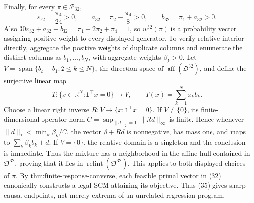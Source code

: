 Finally, for every \(\pi\in\mathcal P_{32}\),
\[
\varepsilon_{32}=\frac{\pi_4}{24}>0,
\qquad
a_{32}=\pi_2-\frac{\pi_4}{8}>0,
\qquad
b_{32}=\pi_1+a_{32}>0.
\tag{36}
\]
Also \(30\varepsilon_{32}+a_{32}+b_{32}=\pi_1+2\pi_2+\pi_4=1\), so \(w^{32}(\pi)\) is a probability vector assigning positive weight to every displayed generator.  To verify relative interior directly, aggregate the positive weights of duplicate columns and enumerate the distinct columns as \(b_1,\ldots,b_N\), with aggregate weights \(\beta_k>0\).  Let \(V=\operatorname{span}\{b_k-b_1:2\leq k\leq N\}\), the direction space of \(\operatorname{aff}(\mathfrak O^{32})\), and define the surjective linear map
\[
T:\{x\in\mathbb R^N:\mathbf 1^{\top}x=0\}\longrightarrow V,
\qquad T(x)=\sum_{k=1}^N x_kb_k.
\]
Choose a linear right inverse \(R:V\to\{x:\mathbf 1^{\top}x=0\}\).  If \(V\neq\{0\}\), its finite-dimensional operator norm \(C=\sup_{\|d\|_2=1}\|Rd\|_\infty\) is finite.  Hence whenever \(\|d\|_2<\min_k\beta_k/C\), the vector \(\beta+Rd\) is nonnegative, has mass one, and maps to \(\sum_k\beta_kb_k+d\).  If \(V=\{0\}\), the relative domain is a singleton and the conclusion is immediate.  Thus the mixture has a neighborhood in the affine hull contained in \(\mathfrak O^{32}\), proving that it lies in \(\operatorname{relint}(\mathfrak O^{32})\).  This applies to both displayed choices of \(\pi\).  By \(\text{thm:finite-response-converse}\), each feasible primal vector in (32) canonically constructs a legal SCM attaining its objective.  Thus (35) gives sharp causal endpoints, not merely extrema of an unrelated regression program.